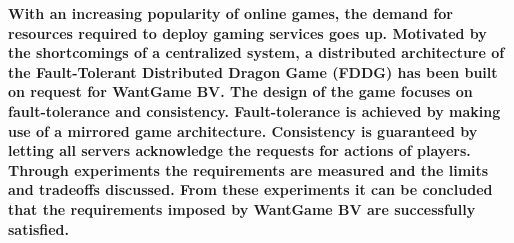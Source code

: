 \textbf{With an increasing popularity of online games, the demand for resources required to deploy gaming services goes up.
	Motivated by the shortcomings of a centralized system, a distributed architecture of the Fault-Tolerant Distributed Dragon Game (FDDG) has been built on request for WantGame BV. 
	The design of the game focuses on fault-tolerance and consistency.
	Fault-tolerance is achieved by making use of a mirrored game architecture. 
	Consistency is guaranteed by letting all servers acknowledge the requests for actions of players. 
	Through experiments the requirements are measured and the limits and tradeoffs discussed.
	From these experiments it can be concluded that the requirements imposed by WantGame BV are successfully satisfied.}